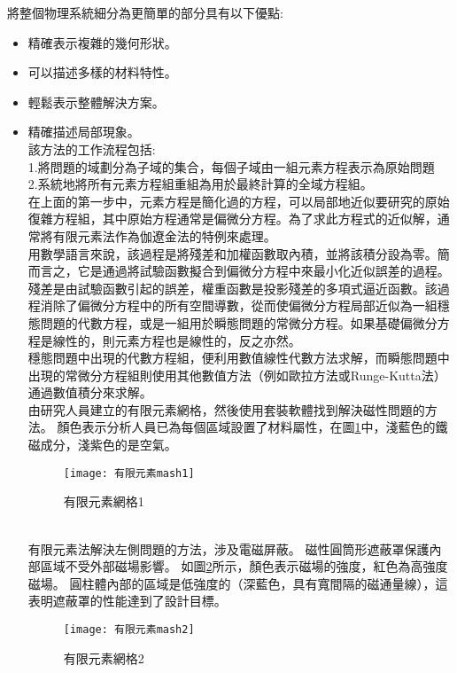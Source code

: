 將整個物理系統細分為更簡單的部分具有以下優點:\\
\begin{itemize}
\item 精確表示複雜的幾何形狀。\\
\item 可以描述多樣的材料特性。\\
\item 輕鬆表示整體解決方案。\\
\item 精確描述局部現象。\\

該方法的工作流程包括:\\

1.將問題的域劃分為子域的集合，每個子域由一組元素方程表示為原始問題\\

2.系統地將所有元素方程組重組為用於最終計算的全域方程組。\\

\qquad 在上面的第一步中，元素方程是簡化過的方程，可以局部地近似要研究的原始復雜方程組，其中原始方程通常是偏微分方程。為了求此方程式的近似解，通常將有限元素法作為伽遼金法的特例來處理。\\

\qquad 用數學語言來說，該過程是將殘差和加權函數取內積，並將該積分設為零。簡而言之，它是通過將試驗函數擬合到偏微分方程中來最小化近似誤差的過程。殘差是由試驗函數引起的誤差，權重函數是投影殘差的多項式逼近函數。該過程消除了偏微分方程中的所有空間導數，從而使偏微分方程局部近似為一組穩態問題的代數方程，或是一組用於瞬態問題的常微分方程。如果基礎偏微分方程是線性的，則元素方程也是線性的，反之亦然。\\

\qquad 穩態問題中出現的代數方程組，便利用數值線性代數方法求解，而瞬態問題中出現的常微分方程組則使用其他數值方法（例如歐拉方法或Runge-Kutta法）通過數值積分來求解。\\

\qquad 由研究人員建立的有限元素網格，然後使用套裝軟體找到解決磁性問題的方法。 顏色表示分析人員已為每個區域設置了材料屬性，在圖\ref{2.84}中，淺藍色的鐵磁成分，淺紫色的是空氣。\\
\begin{figure}[hbt!]
\begin{center}
\texttt{[image: 有限元素mash1]}
\caption{\Large 有限元素網格1}\label{2.84}
\end{center}
\end{figure}
\\
\qquad 有限元素法解決左側問題的方法，涉及電磁屏蔽。 磁性圓筒形遮蔽罩保護內部區域不受外部磁場影響。 如圖\ref{2.85}所示，顏色表示磁場的強度，紅色為高強度磁場。 圓柱體內部的區域是低強度的（深藍色，具有寬間隔的磁通量線），這表明遮蔽罩的性能達到了設計目標。\\
\begin{figure}[hbt!]
\begin{center}
\texttt{[image: 有限元素mash2]}
\caption{\Large 有限元素網格2}\label{2.85}
\end{center}
\end{figure}
\\

\end{itemize}
